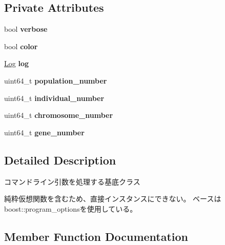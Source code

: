 \subsection*{Private Attributes}
\begin{DoxyCompactItemize}
\item 
\mbox{\label{class_g_a_1_1_options_ab33ec17ac35f1712e7c67b536f44910c}} 
bool {\bfseries verbose}
\item 
\mbox{\label{class_g_a_1_1_options_ab730c521a7b0cfa01ca122079a8b3d88}} 
bool {\bfseries color}
\item 
\mbox{\label{class_g_a_1_1_options_a9e53e11a7f60f5923c7006ec3f589735}} 
\mbox{\hyperlink{class_g_a_1_1_log}{Log}} {\bfseries log}
\item 
\mbox{\label{class_g_a_1_1_options_a092453ebf41cdc99809ba4e35adb09bb}} 
uint64\+\_\+t {\bfseries population\+\_\+number}
\item 
\mbox{\label{class_g_a_1_1_options_a0a112c15fd46f0830a7f42ec2f384800}} 
uint64\+\_\+t {\bfseries individual\+\_\+number}
\item 
\mbox{\label{class_g_a_1_1_options_a876bb34ddc68a08180d50d737cd6e28a}} 
uint64\+\_\+t {\bfseries chromosome\+\_\+number}
\item 
\mbox{\label{class_g_a_1_1_options_a4f567205175c6b7ee39157bc758ccf02}} 
uint64\+\_\+t {\bfseries gene\+\_\+number}
\end{DoxyCompactItemize}


\subsection{Detailed Description}
コマンドライン引数を処理する基底クラス 

純粋仮想関数を含むため、直接インスタンスにできない。 ベースはboost\+::program\+\_\+optionsを使用している。 

\subsection{Member Function Documentation}
\mbox{\label{class_g_a_1_1_options_a8d16d8303f4988f0a5c3cf5b15492c24}} 
